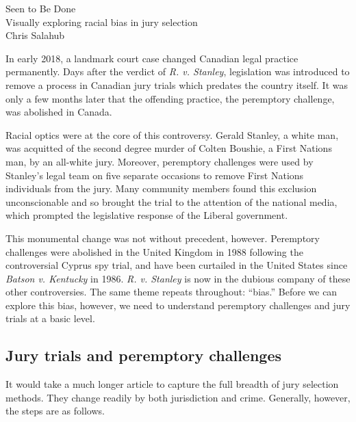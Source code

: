 \documentclass[12pt]{article}
\let\svthefootnote\thefootnote
\begin{document}
\begin{center}
	\Large Seen to Be Done \\ {\large Visually exploring racial bias in jury selection}
	\\ \vspace{0.5cm}
	\large Chris Salahub\let\thefootnote\relax{}
	\let\thefootnote\svthefootnote
\end{center}
 

In early 2018, a landmark court case changed Canadian legal practice permanently. Days after the verdict of \emph{R. v. Stanley}, legislation was introduced to remove a process in Canadian jury trials which predates the country itself. It was only a few months later that the offending practice, the peremptory challenge, was abolished in Canada.

Racial optics were at the core of this controversy. Gerald Stanley, a white man, was acquitted of the second degree murder of Colten Boushie, a First Nations man, by an all-white jury. Moreover, peremptory challenges were used by Stanley's legal team on five separate occasions to remove First Nations individuals from the jury. Many community members found this exclusion unconscionable and so brought the trial to the attention of the national media, which prompted the legislative response of the Liberal government.

This monumental change was not without precedent, however. Peremptory challenges were abolished in the United Kingdom in 1988 following the controversial Cyprus spy trial, and have been curtailed in the United States since \emph{Batson v. Kentucky} in 1986. \emph{R. v. Stanley} is now in the dubious company of these other controversies. The same theme repeats throughout: ``bias.'' Before we can explore this bias, however, we need to understand peremptory challenges and jury trials at a basic level.

\subsection*{Jury trials and peremptory challenges}

It would take a much longer article to capture the full breadth of jury selection methods. They change readily by both jurisdiction and crime. Generally, however, the steps are as follows.
\end{document}
